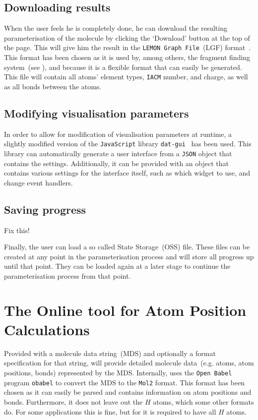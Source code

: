 \subsection{Downloading results}
When the user feels he is completely done, he can download the resulting parameterisation of the molecule by clicking the `Download' button at the top of the page. This will give him the result in the \verb|LEMON Graph File|~(LGF) format~\cite{dezso2011lemon}. This format has been chosen as it is used by, among others, the fragment finding system~(see ), and because it is a flexible format that can easily be generated. This file will contain all atoms' element types, \verb|IACM| number, and charge, as well as all bonds between the atoms.


\subsection{Modifying visualisation parameters}
In order to allow for modification of visualisation parameters at runtime, a slightly modified version of the \verb|JavaScript| library \verb|dat-gui|~\cite{data2011dat} has been used. This library can automatically generate a user interface from a \verb|JSON| object that contains the settings. Additionally, it can be provided with an object that contains various settings for the interface itself, such as which widget to use, and change event handlers.

\subsection{Saving progress}
\begin{todo}
\item Fix this!
\end{todo}
Finally, the user can load a so called \oframp{} State Storage~(OSS) file. These files can be created at any point in the parameterisation process and will store all progress up until that point. They can be loaded again at a later stage to continue the parameterisation process from that point.



\section[\oapoc]{The Online tool for Atom Position Calculations}
Provided with a molecule data string~(MDS) and optionally a format specification for that string, \oapoc{} will provide detailed molecule data~(e.g. atoms, atom positions, bonds) represented by the MDS. Internally, \oapoc{} uses the \verb|Open Babel| program \verb|obabel| to convert the MDS to the \verb|Mol2| format. This format has been chosen as it can easily be parsed and contains information on atom positions and bonds. Furthermore, it does not leave out the $H$ atoms, which some other formats do. For some applications this is fine, but for \oframp{} it is required to have all $H$ atoms.

